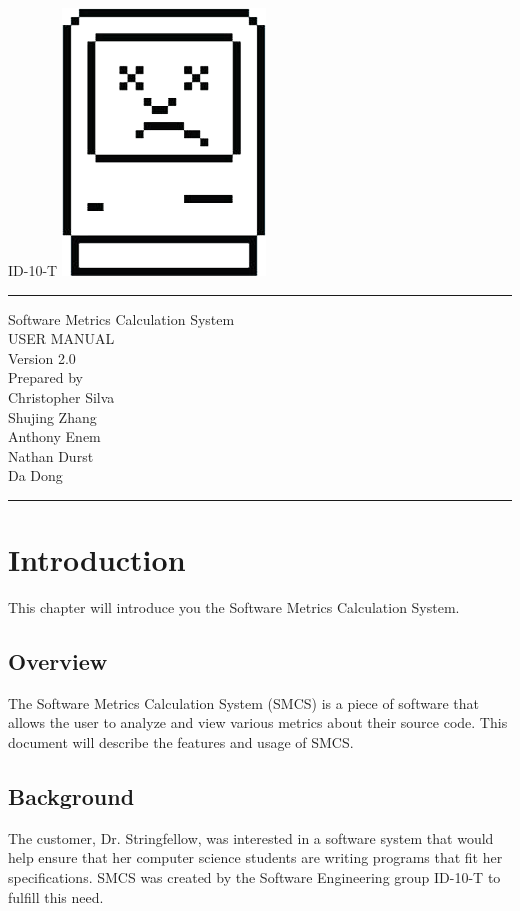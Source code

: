 \documentclass{scrreprt}
\author{Christopher Silva}
\date{}
\def\myversion{2.0 }
\begin{document}
	\begin{titlepage}
		\flushright
		\LARGE{ID-10-T}
		\includegraphics[scale=0.08]{logo.png}
		\rule{16cm}{5pt}\vskip1cm
		\centering
		\Huge{Software Metrics Calculation System}\\
		\vspace{2cm}
		\Huge{USER MANUAL}\\
		\vspace{2cm}
		\LARGE{Version \myversion\\}
		\vspace{2cm}
		Prepared by\\
	    Christopher Silva\\
	    Shujing Zhang\\
		Anthony Enem\\
		Nathan Durst\\
		Da Dong\\
		\vfill
		\rule{16cm}{5pt}
	\end{titlepage}
	\tableofcontents
	\chapter{Introduction}
	This chapter will introduce you the Software Metrics Calculation System.
	
	\section{Overview}
	The Software Metrics Calculation System (SMCS) is a piece of software that allows the user to analyze and view various metrics about their source code. 
	This document will describe the features and usage of SMCS.
	
	\section{Background}
	The customer, Dr. Stringfellow, was interested in a software system that would help ensure that her computer science students are writing programs that fit her specifications.
	SMCS was created by the Software Engineering group ID-10-T to fulfill this need.
	
\end{document}
